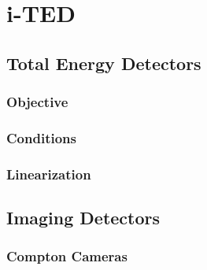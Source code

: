 \chapter{i-TED}\label{ch:detector}

\section{Total Energy Detectors}

\subsection{Objective}

\subsection{Conditions}

\subsection{Linearization}

\section{Imaging Detectors}

\subsection{Compton Cameras}

